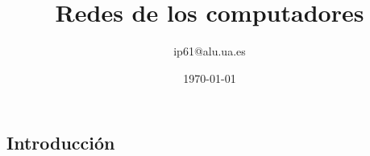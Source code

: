 \documentclass{article}
\title{Redes de los computadores}
\author{ip61@alu.ua.es}
\date{\today}
\begin{document}
	\maketitle
	
	\begin{multicols}{2}
	\section{Introducción}
		
	\end{multicols}
	
\end{document}
